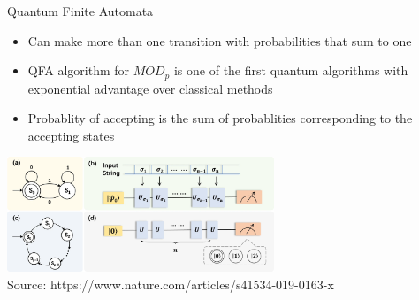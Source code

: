 \documentclass[aspectratio=169,9pt]{beamer}
\begin{document}
\begin{frame}[t]{Quantum Finite Automata}
  \begin{itemize}
    \item Can make more than one transition with probabilities that sum to one
    \item QFA algorithm for $MOD_p$ is one of the first quantum algorithms with exponential advantage over classical methods
    \item Probablity of accepting is the sum of probablities corresponding to the accepting states
  \end{itemize}
  \includegraphics[width=0.6\textwidth]{DFA.png}\\
  Source: https://www.nature.com/articles/s41534-019-0163-x
\end{frame}


\end{document}
